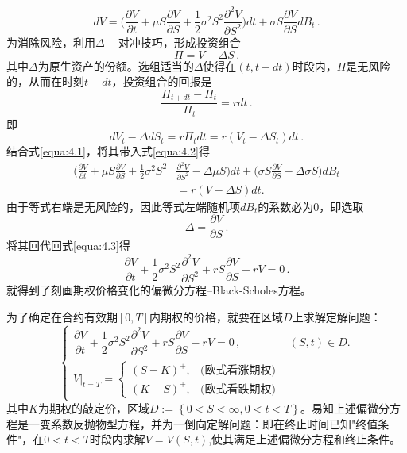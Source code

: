 \documentclass[oneside]{sysuthesis}
\begin{document}
\begin{equation}\label{equa:4.1}
	dV=\bigg(\frac{\partial V}{\partial t}+\mu S\frac{\partial V}{\partial S}+\frac{1}{2}\sigma^2 S^2\frac{\partial^2 V}{\partial S^2}\bigg)dt
	+\sigma S\frac{\partial V}{\partial S}dB_t\,.
\end{equation}
为消除风险，利用$\Delta-$对冲技巧\cite{hull2018}，形成投资组合
\begin{equation*}
	\Pi=V-\Delta S\,.
\end{equation*}
其中$\Delta$为原生资产的份额。选组适当的$\Delta$使得在$(t,t+dt)$时段内，$\Pi$是无风险的，从而在时刻$t+dt$，投资组合的回报是
\begin{equation*}
	\frac{\Pi_{t+dt}-\Pi_t}{\Pi_t}=rdt\,.
\end{equation*}
即
\begin{equation}\label{equa:4.2}
	dV_t-\Delta dS_t=r\Pi_t dt=r(V_t-\Delta S_t)dt\,.
\end{equation}
结合式\eqref{equa:4.1}，将其带入式\eqref{equa:4.2}得
\begin{equation}\label{equa:4.3}
	\begin{split}
		\bigg(\frac{\partial V}{\partial t}+\mu S\frac{\partial V}{\partial S}+\frac{1}{2}\sigma^2 S^2&\frac{\partial^2 V}{\partial S^2}-\Delta\mu S\bigg)dt+\bigg(\sigma S\frac{\partial V}{\partial S}-\Delta\sigma S\bigg)dB_t\\
		&=r(V-\Delta S)dt.
	\end{split}
\end{equation}
由于等式右端是无风险的，因此等式左端随机项$dB_t$的系数必为0，即选取
\begin{equation*}
	\Delta=\frac{\partial V}{\partial S}\,.
\end{equation*}
将其回代回式\eqref{equa:4.3}得
\begin{equation}
	\frac{\partial V}{\partial t}+\frac{1}{2}\sigma^2 S^2\frac{\partial^2 V}{\partial S^2}+rS\frac{\partial V}{\partial S}-rV=0\,.
\end{equation}
就得到了刻画期权价格变化的偏微分方程--Black-Scholes方程。

为了确定在合约有效期$[0,T]$内期权的价格，就要在区域$D$上求解定解问题：
\[
\begin{cases}
	\dfrac{\partial V}{\partial t} + \dfrac{1}{2}\sigma^2 S^2 \dfrac{\partial^2 V}{\partial S^2} + rS \dfrac{\partial V}{\partial S} - rV = 0\,, & (S,t)\in D.\\[10pt]
	V|_{t=T} = 
	\begin{cases}
		(S - K)^+, & \text{(欧式看涨期权)} \\
		(K - S)^+, & \text{(欧式看跌期权)}
	\end{cases}
\end{cases}
\]
其中$K$为期权的敲定价，区域$D:=\left\{0<S<\infty,0<t<T\right\}$。易知上述偏微分方程是一变系数反抛物型方程，并为一倒向定解问题：即在终止时间已知"终值条件"，在$0<t<T$时段内求解$V=V(S,t)$,使其满足上述偏微分方程和终止条件。
\end{document}
